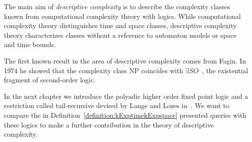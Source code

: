 The main aim of \emph{descriptive complexity} is to describe the complexity classes known from
computational complexity theory with logics. While computational complexity theory distinguishes time and space
classes, descriptive complexity theory characterizes classes without a reference to automaton models or
space and time bounds.

The first known result in the area of descriptive complexity comes from Fagin. In 1974 he showed that the complexity
class NP coincides with $\exists SO$~\cite{fagin1974generalized}, the existential fragment of second-order logic.

In the next chapter we introduce the polyadic higher order fixed point logic and a restriction called tail-recursive
devised by Lange and Lozes in~\cite{lange2014capturing}. We want to compare the in
Definition~\ref{definition:kExptimekExpspace} presented queries with these logics to make a further contribution in
the theory of descriptive complexity.